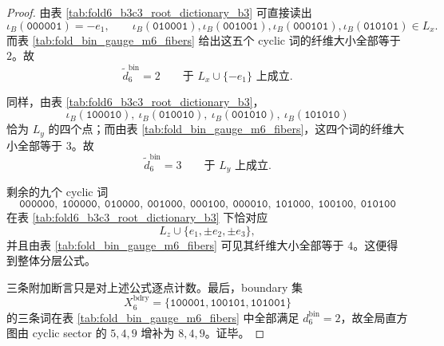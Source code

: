 \begin{proof}
由表 \ref{tab:fold6_b3c3_root_dictionary_b3} 可直接读出
\[
\iota_B(\texttt{000001})=-e_1,
\qquad
\iota_B(\texttt{010001}),\iota_B(\texttt{001001}),
\iota_B(\texttt{000101}),\iota_B(\texttt{010101})\in L_x.
\]
而表 \ref{tab:fold_bin_gauge_m6_fibers} 给出这五个 cyclic 词的纤维大小全部等于 \(2\)。故
\[
\widetilde d_6^{\mathrm{bin}}=2
\qquad\text{于 }L_x\cup\{-e_1\}\text{ 上成立}.
\]

同样，由表 \ref{tab:fold6_b3c3_root_dictionary_b3}，
\[
\iota_B(\texttt{100010}),\ \iota_B(\texttt{010010}),\ \iota_B(\texttt{001010}),\ \iota_B(\texttt{101010})
\]
恰为 \(L_y\) 的四个点；而由表 \ref{tab:fold_bin_gauge_m6_fibers}，这四个词的纤维大小全部等于 \(3\)。故
\[
\widetilde d_6^{\mathrm{bin}}=3
\qquad\text{于 }L_y\text{ 上成立}.
\]

剩余的九个 cyclic 词
\[
\texttt{000000},\ \texttt{100000},\ \texttt{010000},\ \texttt{001000},\ \texttt{000100},
\ \texttt{000010},\ \texttt{101000},\ \texttt{100100},\ \texttt{010100}
\]
在表 \ref{tab:fold6_b3c3_root_dictionary_b3} 下恰对应
\[
L_z\cup \{e_1,\pm e_2,\pm e_3\},
\]
并且由表 \ref{tab:fold_bin_gauge_m6_fibers} 可见其纤维大小全部等于 \(4\)。这便得到整体分层公式。

三条附加断言只是对上述公式逐点计数。最后，boundary 集
\[
X_6^{\mathrm{bdry}}
=
\{\texttt{100001},\texttt{100101},\texttt{101001}\}
\]
的三条词在表 \ref{tab:fold_bin_gauge_m6_fibers} 中全部满足 \(d_6^{\mathrm{bin}}=2\)，故全局直方图由 cyclic sector 的 \(5,4,9\) 增补为 \(8,4,9\)。证毕。
\end{proof}

